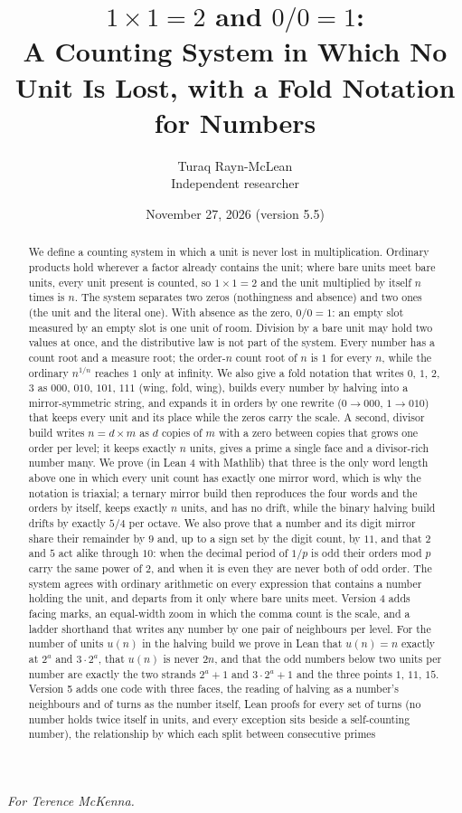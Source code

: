 \documentclass[11pt]{article}
\title{$1\times1 = 2$ and $0/0 = 1$:\\[4pt]\large A Counting System in Which No Unit Is Lost, with a Fold Notation for Numbers}
\author{Turaq Rayn-McLean\\Independent researcher}
\date{November 27, 2026 (version 5.5)}
\begin{document}
\maketitle
\begin{center}\emph{For Terence McKenna.}\end{center}

\begin{abstract}
We define a counting system in which a unit is never lost in multiplication. Ordinary products hold wherever a factor already contains the unit; where bare units meet bare units, every unit present is counted, so $1\times1 = 2$ and the unit multiplied by itself $n$ times is $n$. The system separates two zeros (nothingness and absence) and two ones (the unit and the literal one). With absence as the zero, $0/0 = 1$: an empty slot measured by an empty slot is one unit of room. Division by a bare unit may hold two values at once, and the distributive law is not part of the system. Every number has a count root and a measure root; the order-$n$ count root of $n$ is $1$ for every $n$, while the ordinary $n^{1/n}$ reaches $1$ only at infinity. We also give a fold notation that writes $0$, $1$, $2$, $3$ as $000$, $010$, $101$, $111$ (wing, fold, wing), builds every number by halving into a mirror-symmetric string, and expands it in orders by one rewrite ($0\to000$, $1\to010$) that keeps every unit and its place while the zeros carry the scale. A second, divisor build writes $n = d\times m$ as $d$ copies of $m$ with a zero between copies that grows one order per level; it keeps exactly $n$ units, gives a prime a single face and a divisor-rich number many. We prove (in Lean 4 with Mathlib) that three is the only word length above one in which every unit count has exactly one mirror word, which is why the notation is triaxial; a ternary mirror build then reproduces the four words and the orders by itself, keeps exactly $n$ units, and has no drift, while the binary halving build drifts by exactly $5/4$ per octave. We also prove that a number and its digit mirror share their remainder by $9$ and, up to a sign set by the digit count, by $11$, and that $2$ and $5$ act alike through $10$: when the decimal period of $1/p$ is odd their orders mod $p$ carry the same power of $2$, and when it is even they are never both of odd order. The system agrees with ordinary arithmetic on every expression that contains a number holding the unit, and departs from it only where bare units meet. Version 4 adds facing marks, an equal-width zoom in which the comma count is the scale, and a ladder shorthand that writes any number by one pair of neighbours per level. For the number of units $u(n)$ in the halving build we prove in Lean that $u(n) = n$ exactly at $2^a$ and $3\cdot2^a$, that $u(n)$ is never $2n$, and that the odd numbers below two units per number are exactly the two strands $2^a+1$ and $3\cdot2^a+1$ and the three points $1$, $11$, $15$. Version 5 adds one code with three faces, the reading of halving as a number's neighbours and of turns as the number itself, Lean proofs for every set of turns (no number holds twice itself in units, and every exception sits beside a self-counting number), the relationship by which each split between consecutive primes 
\end{abstract}
\end{document}
